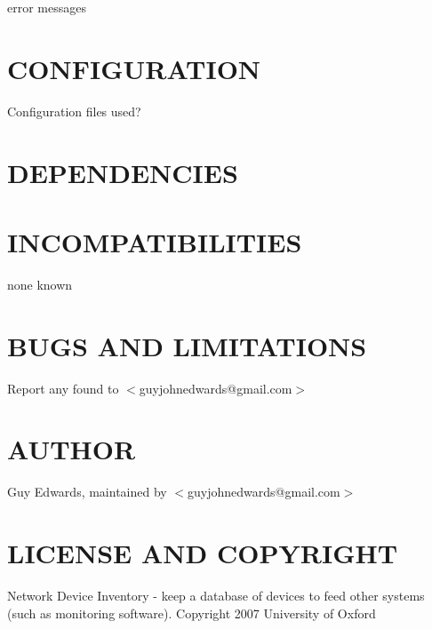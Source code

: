 \documentclass{book}
\begin{document}
error messages


\section{CONFIGURATION}
\label{_CONFIGURATION}
\hypertarget{_CONFIGURATION}{}



Configuration files used?


\section{DEPENDENCIES}
\label{_DEPENDENCIES}
\hypertarget{_DEPENDENCIES}{}


\section{INCOMPATIBILITIES}
\label{_INCOMPATIBILITIES}
\hypertarget{_INCOMPATIBILITIES}{}



none known


\section{BUGS AND LIMITATIONS}
\label{_BUGS_AND_LIMITATIONS}
\hypertarget{_BUGS_AND_LIMITATIONS}{}



Report any found to $<$guyjohnedwards@gmail.com$>$


\section{AUTHOR}
\label{_AUTHOR}
\hypertarget{_AUTHOR}{}



Guy Edwards, maintained by $<$guyjohnedwards@gmail.com$>$


\section{LICENSE AND COPYRIGHT}
\label{_LICENSE_AND_COPYRIGHT}
\hypertarget{_LICENSE_AND_COPYRIGHT}{}



Network Device Inventory - keep a database of devices to feed other systems (such as monitoring software). Copyright 2007 University of Oxford
\end{document}
